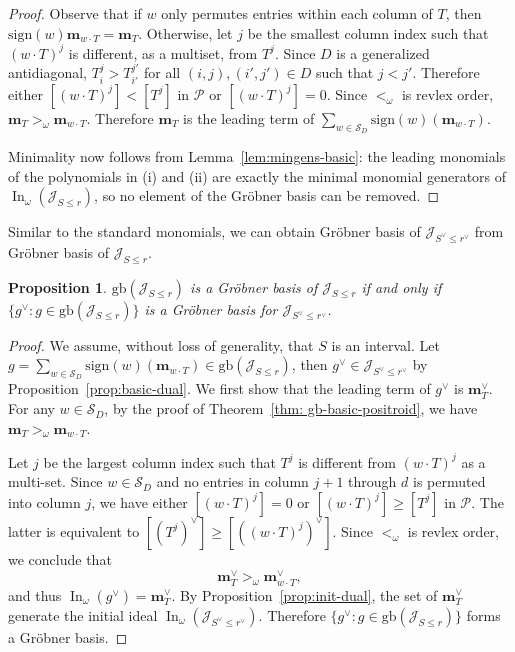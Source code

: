 \documentclass[12pt,reqno]{amsart}
\newtheorem{prop}[lemma]{Proposition}
\theoremstyle{definition}
\newcommand{\inn}{\operatorname{In}}
\newcommand{\sgn}{\text{sign}}
\newcommand{\mm}{\mathbf m}
\newcommand{\cJ}{\mathcal{J}}
\newcommand{\cP}{\mathcal{P}}
\newcommand{\symm}{\mathcal{S}}
\begin{document}
{\begin{proof}
Observe that if $w$ only permutes entries within each column of $T$, then $\sgn(w)\mm_{w\cdot T} = \mm_{T}$. Otherwise, let $j$ be the smallest column index such that $(w\cdot T)^j$ is different, as a multiset, from $T^j$. Since $D$ is a generalized antidiagonal, $T_{i}^j>T_{i'}^{j'}$ for all $(i,j),(i',j')\in D$ such that $j<j'$. Therefore 
either $[(w\cdot T)^j]<[T^j]$ in $\cP$ or $[(w\cdot T)^j] = 0$. Since $<_\omega$ is revlex order, $\mm_T>_\omega \mm_{w\cdot T}$. Therefore $\mm_T$ is the leading term of $\sum_{w\in \symm_D}\sgn(w)(\mm_{w\cdot T})$. 

Minimality now follows from Lemma~\ref{lem:mingens-basic}:
the leading monomials of the polynomials in (i) and (ii) are exactly the minimal monomial generators of
\(\inn_\omega(\cJ_{S\le r})\), so no element of the Gr\"obner basis can be removed.
\end{proof}

Similar to the standard monomials, we can obtain Gr\"obner basis of $\cJ_{S^\vee\leq r^\vee}$ from Gr\"obner basis of $\cJ_{S\leq r}$. 

\begin{prop}
    \label{prop:dual-gb}
    $\mathrm{gb}(\cJ_{S\le r})$ is a Gr\"obner basis of $\cJ_{S\le r}$ if and only if $\{g^\vee: g\in \mathrm{gb}(\cJ_{S\le r})\}$ is a Gr\"obner basis for $\cJ_{S^\vee\le r^\vee}$.
\end{prop}


\begin{proof}
We assume, without loss of generality, that $S$ is an interval.
Let $g = \sum_{w\in \symm_D}\sgn(w)(\mm_{w\cdot T})\in \mathrm{gb}(\cJ_{S\le r})$, then $g^\vee \in \cJ_{S^\vee\le r^\vee}$ by Proposition~\ref{prop:basic-dual}. We first show that the leading term of $g^\vee$ is $\mm_{T}^\vee$. For any $w\in \symm_{D}$, by the proof of Theorem~\ref{thm: gb-basic-positroid}, we have
$\mm_T>_\omega \mm_{w\cdot T}$. 

Let $j$ be the largest column index such that ${T}^j$ is different from $(w\cdot T)^j$ as a multi-set. Since $w\in \symm_D$ and no entries in column $j+1$ through $d$ is permuted into column $j$, we have either $[(w\cdot T)^j]  = 0$ or $[(w\cdot T)^j] \geq [T^j]$ in $\cP$. The latter is equivalent to $[(T^j)^\vee] \geq [((w\cdot T)^j)^\vee]$. Since $<_\omega$ is revlex order, we conclude that 
\[\mm_T^\vee >_\omega \mm_{w\cdot T}^\vee,\]
and thus $\inn_\omega(g^\vee) = \mm_T^\vee$. By Proposition~\ref{prop:init-dual}, the set of $\mm_T^\vee$ generate the initial ideal $\inn_\omega(\cJ_{S^\vee\leq r^\vee})$. Therefore $\{g^\vee: g\in \mathrm{gb}(\cJ_{S\le r})\}$ forms a Gr\"obner basis.
\end{proof}

}
\end{document}
